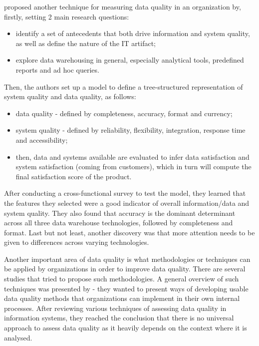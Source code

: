 \documentclass{mprop}
\begin{document}
\citet{nelson2005antecedents} proposed another technique for measuring data 
quality in an organization by, firstly, setting 2 main research questions:
  \begin{itemize}
    \item identify a set of antecedents that both drive information and
      system quality, as well as define the nature of the IT artifact;
    \item explore data warehousing in general, especially analytical tools,
      predefined reports and ad hoc queries.
  \end{itemize}

Then, the authors set up a model to define a tree-structured representation
of system quality and data quality, as follows:
  \begin{itemize}
    \item data quality - defined by completeness, accuracy, format and currency;
    \item system quality - defined by reliability, flexibility, integration,
    response time and accessibility;
    \item then, data and systems available are evaluated to infer 
    data satisfaction and system satisfaction (coming from customers), which
    in turn will compute the final satisfaction score of the product.
  \end{itemize}

After conducting a cross-functional survey to test the model, they learned that
the features they selected were a good indicator of overall information/data and
system quality. They also found that accuracy is the dominant determinant across
all three data warehouse technologies, followed by completeness and format. Last
but not least, another discovery was that more attention needs to be given to
differences across varying technologies.

Another important area of data quality is what methodologies or techniques can 
be applied by organizations in order to improve data quality. 
There are several studies that tried to propose such methodologies. A general 
overview of such techniques  was presented by \citet{pipino2002data} - they 
wanted to present ways of developing usable  data quality methods that 
organizations can implement in their own internal processes. After reviewing 
various techniques of assessing data quality in information systems, they reached 
the conclusion that there is no universal approach to assess data quality as it  
heavily depends on the context where it is analysed. 
\end{document}
